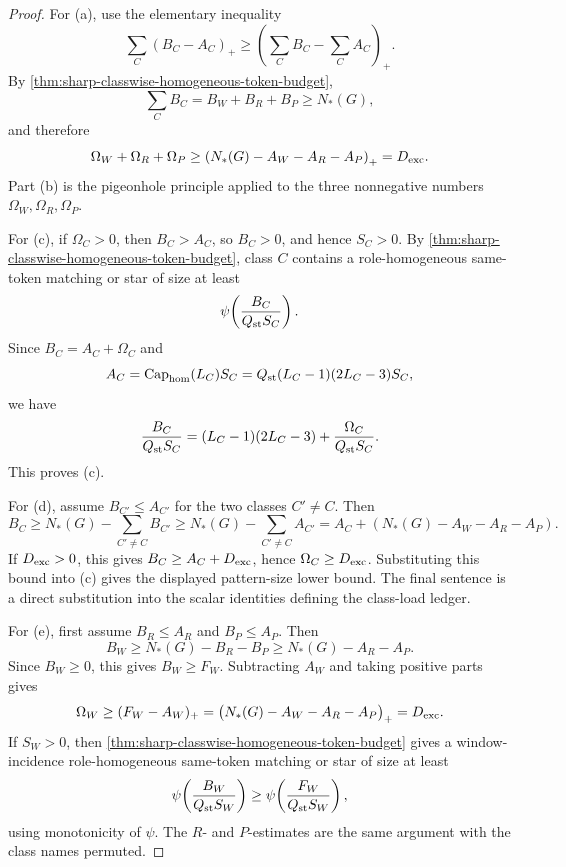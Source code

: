 \documentclass[11pt]{article}
\begin{document}
\begin{proof}
For (a), use the elementary inequality
\[
\sum_C (B_C-A_C)_+
\ge
\left(\sum_C B_C-\sum_C A_C\right)_+ .
\]
By \cref{thm:sharp-classwise-homogeneous-token-budget},
\[
\sum_C B_C=B_W+B_R+B_P\ge N_*(G),
\]
and therefore
\[
\Omega_W+\Omega_R+\Omega_P
\ge
\left(N_*(G)-A_W-A_R-A_P\right)_+
=D_{\rm exc}.
\]
Part (b) is the pigeonhole principle applied to the three nonnegative numbers
\(\Omega_W,\Omega_R,\Omega_P\).

For (c), if \(\Omega_C>0\), then \(B_C>A_C\), so \(B_C>0\), and hence
\(S_C>0\).  By
\cref{thm:sharp-classwise-homogeneous-token-budget}, class \(C\) contains a
role-homogeneous same-token matching or star of size at least
\[
\psi\!\left(\frac{B_C}{Q_{\rm st}S_C}\right).
\]
Since \(B_C=A_C+\Omega_C\) and
\[
A_C=\operatorname{Cap}_{\rm hom}(L_C)S_C
=Q_{\rm st}(L_C-1)(2L_C-3)S_C,
\]
we have
\[
\frac{B_C}{Q_{\rm st}S_C}
=(L_C-1)(2L_C-3)+\frac{\Omega_C}{Q_{\rm st}S_C}.
\]
This proves (c).

For (d), assume \(B_{C'}\le A_{C'}\) for the two classes \(C'\ne C\).  Then
\[
B_C
\ge
N_*(G)-\sum_{C'\ne C}B_{C'}
\ge
N_*(G)-\sum_{C'\ne C}A_{C'}
=
A_C+\left(N_*(G)-A_W-A_R-A_P\right).
\]
If \(D_{\rm exc}>0\), this gives \(B_C\ge A_C+D_{\rm exc}\), hence
\(\Omega_C\ge D_{\rm exc}\).  Substituting this bound into (c) gives the
displayed pattern-size lower bound.  The final sentence is a direct
substitution into the scalar identities defining the class-load ledger.

For (e), first assume \(B_R\le A_R\) and \(B_P\le A_P\).  Then
\[
B_W
\ge
N_*(G)-B_R-B_P
\ge
N_*(G)-A_R-A_P.
\]
Since \(B_W\ge0\), this gives \(B_W\ge F_W\).  Subtracting \(A_W\) and taking
positive parts gives
\[
\Omega_W\ge(F_W-A_W)_+
=\bigl(N_*(G)-A_W-A_R-A_P\bigr)_+
=D_{\rm exc}.
\]
If \(S_W>0\), then
\cref{thm:sharp-classwise-homogeneous-token-budget} gives a window-incidence
role-homogeneous same-token matching or star of size at least
\[
\psi\!\left(\frac{B_W}{Q_{\rm st}S_W}\right)
\ge
\psi\!\left(\frac{F_W}{Q_{\rm st}S_W}\right),
\]
using monotonicity of \(\psi\).  The \(R\)- and \(P\)-estimates are the same
argument with the class names permuted.
\end{proof}
\end{document}
